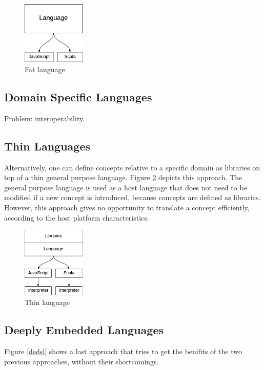 \documentclass[preprint]{sigplanconf}
\begin{document}
\begin{figure}
  \centering
  \includegraphics[width=3cm]{fat.pdf}
  \caption{Fat language}
  \label{fat-lang}
\end{figure}

\subsection{Domain Specific Languages}

Problem: interoperability.

\subsection{Thin Languages}

Alternatively, one can define concepts relative to a specific domain as libraries on top of a thin general purpose
language. Figure \ref{thin-lang} depicts this approach. The general purpose language is used as a host language that
does not need to be modified if a new concept is introduced, because concepts are defined as libraries. However,
this approach gives no opportunity to translate a concept efficiently, according to the host platform
characteristics.

\begin{figure}
  \centering
  \includegraphics[width=3cm]{thin.pdf}
  \caption{Thin language}
  \label{thin-lang}
\end{figure}

\subsection{Deeply Embedded Languages}

Figure \ref{dedsl} shows a last approach that tries to get the benifits of the two previous approaches, without
their shortcomings.
\end{document}
